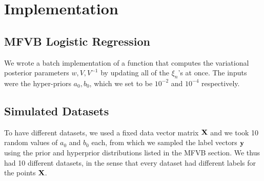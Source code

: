 
\section{Implementation}\label{sec:implement}

\subsection{MFVB Logistic Regression}
We wrote a batch implementation of a function that computes the variational posterior parameters $w, V, V^{-1}$ by updating all of the $\xi_n$'s at once. The inputs were the hyper-priors $a_0, b_0$, which we set to be $10^{-2}$ and $10^{-4}$ respectively.

\subsection{Simulated Datasets}
To have different datasets, we used a fixed data vector matrix $\boldsymbol{\mathbf{X}}$ and we took 10 random values of $a_0$ and $ b_0$ each, from which we sampled the label vectors $\boldsymbol{\mathbf{y}}$ using the prior and hyperprior distributions listed in the MFVB section. We thus had 10 different datasets, in the sense that every dataset had different labels for the points $\boldsymbol{\mathbf{X}}$. 